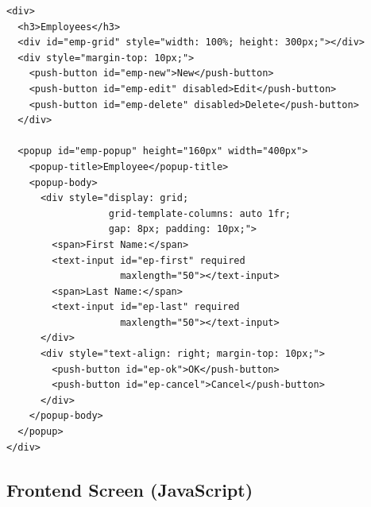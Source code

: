 \begin{lstlisting}[style=html]
<div>
  <h3>Employees</h3>
  <div id="emp-grid" style="width: 100%; height: 300px;"></div>
  <div style="margin-top: 10px;">
    <push-button id="emp-new">New</push-button>
    <push-button id="emp-edit" disabled>Edit</push-button>
    <push-button id="emp-delete" disabled>Delete</push-button>
  </div>

  <popup id="emp-popup" height="160px" width="400px">
    <popup-title>Employee</popup-title>
    <popup-body>
      <div style="display: grid;
                  grid-template-columns: auto 1fr;
                  gap: 8px; padding: 10px;">
        <span>First Name:</span>
        <text-input id="ep-first" required
                    maxlength="50"></text-input>
        <span>Last Name:</span>
        <text-input id="ep-last" required
                    maxlength="50"></text-input>
      </div>
      <div style="text-align: right; margin-top: 10px;">
        <push-button id="ep-ok">OK</push-button>
        <push-button id="ep-cancel">Cancel</push-button>
      </div>
    </popup-body>
  </popup>
</div>
\end{lstlisting}

\subsection{Frontend Screen (JavaScript)}

